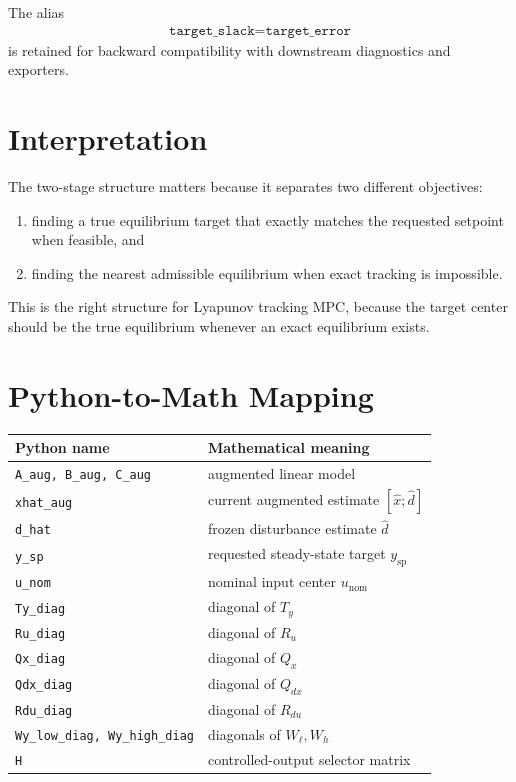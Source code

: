 \documentclass[11pt]{article}
\begin{document}
The alias
\begin{align}
    \texttt{target\_slack} = \texttt{target\_error}
\end{align}
is retained for backward compatibility with downstream diagnostics and exporters.

\section{Interpretation}
The two-stage structure matters because it separates two different objectives:
\begin{enumerate}
    \item finding a true equilibrium target that exactly matches the requested setpoint when feasible, and
    \item finding the nearest admissible equilibrium when exact tracking is impossible.
\end{enumerate}
This is the right structure for Lyapunov tracking MPC, because the target center
should be the true equilibrium whenever an exact equilibrium exists.

\section{Python-to-Math Mapping}
\begin{center}
\begin{tabular}{ll}
\toprule
Python name & Mathematical meaning \\
\midrule
\texttt{A\_aug, B\_aug, C\_aug} & augmented linear model \\
\texttt{xhat\_aug} & current augmented estimate $[\hat x;\hat d]$ \\
\texttt{d\_hat} & frozen disturbance estimate $\hat d$ \\
\texttt{y\_sp} & requested steady-state target $y_{\mathrm{sp}}$ \\
\texttt{u\_nom} & nominal input center $u_{\mathrm{nom}}$ \\
\texttt{Ty\_diag} & diagonal of $T_y$ \\
\texttt{Ru\_diag} & diagonal of $R_u$ \\
\texttt{Qx\_diag} & diagonal of $Q_x$ \\
\texttt{Qdx\_diag} & diagonal of $Q_{dx}$ \\
\texttt{Rdu\_diag} & diagonal of $R_{du}$ \\
\texttt{Wy\_low\_diag, Wy\_high\_diag} & diagonals of $W_{\ell}, W_h$ \\
\texttt{H} & controlled-output selector matrix \\
\bottomrule
\end{tabular}
\end{center}
\end{document}
